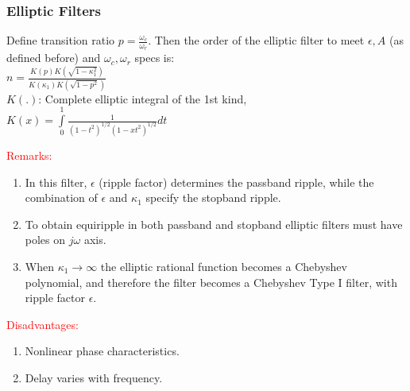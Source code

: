 \documentclass[mathserif, 10pt]{beamer} %
\begin{document}
\frame
{
\small
\frametitle{Elliptic Filters}
Define transition ratio $p = \frac{\omega_c}{\omega_r}$.  Then the order of the elliptic filter to meet $\epsilon, A$ (as defined before) and $\omega_c,\omega_r$ specs is:\\ \vspace{.07in}
$n = \frac{K(p)K(\sqrt{1-\kappa_1^2})}{K(\kappa_1)K(\sqrt{1-p^2})}$\\ \vspace{.06in}
$K(.)$:  Complete elliptic integral of the 1st kind, \\ \vspace{.06in}
$K(x) = \int\limits_0^1 \frac{1}{(1-t^2)^{1/2}(1-xt^2)^{1/2}} dt$ \vspace{.05in}

\textcolor{red}{Remarks:}\\
\begin{enumerate}
	\item In this filter, $\epsilon$ (ripple factor) determines the passband ripple, while the combination of $\epsilon$ and $\kappa_1$ specify the stopband ripple.
	\item To obtain equiripple in both passband and stopband elliptic filters must have poles on $j\omega$ axis.
    \item When  $\kappa_1 \rightarrow \infty$  the elliptic rational function becomes a Chebyshev polynomial, and therefore the filter becomes a Chebyshev Type I filter, with ripple factor $\epsilon$.
\end{enumerate}

\textcolor{red}{Disadvantages:}\\
\begin{enumerate}
	\item Nonlinear phase characteristics.
	\item Delay varies with frequency.
\end{enumerate}

}
\end{document}
